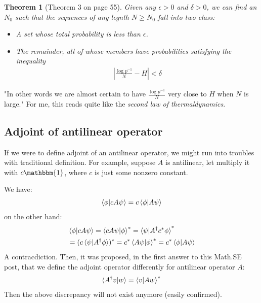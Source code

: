 \documentclass{article}
\numberwithin{equation}{subsection} %
\newtheorem{thm}{Theorem}[section]
\theoremstyle{definition}
\begin{document}
    \begin{thm}[Theorem 3 on page 55]
        Given any $\epsilon >0$ and $\delta >0$, we can find an $N_0$
        such that the sequences of any legnth $N\geq N_0$ fall into
        two class:
        \begin{itemize}
            \item A set whose total probability is less than $\epsilon$.
            \item The remainder, all of whose members have probabilities
                satisfying the inequality
                \begin{align}
                    \label{eq:Entropy_of_info_source:thm3}
                    \left| \frac{\log p^{-1}}{N}-H\right| < \delta
                \end{align}
        \end{itemize}
    \end{thm}
    "In other words we are almost certain to have 
    $\frac{\log p^{-1}}{N}$ very close to $H$ when $N$ is large."
    For me, this reads quite like the \textit{second law of
    thermaldynamics}.


    \subsection{Adjoint of antilinear operator}
    \label{sec:Adjoint_of_antilinear_operator}
    
    If we were to define adjoint of an antilinear operator, we might
    run into troubles with traditional definition. For example, suppose
    $A$ is antilinear, let multiply it with $c\mathbbm{1}$, where $c$
    is just some nonzero constant.

    We have:
    \begin{align}
        \braket{\phi|cA \psi} = c\braket{\phi|A\psi}
    \end{align}
    on the other hand:
    \begin{align}
        &\braket{\phi|cA \psi} = \braket{cA\psi|\phi}^*
            = \braket{\psi|A^\dagger c^* \phi}^* \nonumber\\
        &=(c\braket{\psi|A^\dagger \phi})^* = c^* \braket{A\psi|\phi}^*
            = c^* \braket{\phi|A\psi}
    \end{align}
    A contracdiction. Then, it was proposed, in the first answer to
    this Math.SE post, that we define the adjoint operator differently 
    for antilinear operator $A$:
    \begin{align}
        \braket{A^\dagger v|w} = \braket{v| Aw}^*
    \end{align}
    Then the above discrepancy will not exist anymore (easily confirmed).
\end{document}
